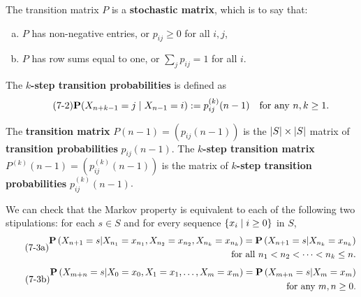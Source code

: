 \begin{theorem}
The transition matrix $P$ is a \textbf{stochastic matrix}, which is to say that: 
\begin{enumerate}[(a)]
    \item $P$ has non-negative entries, or $p_{ij} \geq 0$ for all $i, j$, 
    \item $P$ has row sums equal to one, or $\sum_j p_{ij} = 1$ for all $i$.
\end{enumerate}
\end{theorem}


\begin{definition}
The \textbf{$k$-step transition probabilities} is defined as
\begin{equation}
    \label{eq:7.2}
    \tag{7-2}
    \mathbf{P}(X_{n+k-1} = j \;\vert\; X_{n-1} = i) := p_{ij}^{(k)}(n-1) \quad \text{for any } n, k \geq 1.
\end{equation}
\end{definition}

\begin{definition}
The \textbf{transition matrix} $P(n-1) = (p_{ij}(n-1))$ is the $\left\vert S \right\vert \times \left\vert S \right\vert$ matrix of \textbf{transition probabilities} $p_{ij}(n-1)$. The \textbf{$k$-step transition matrix} $P^{(k)}(n-1) = (p_{ij}^{(k)}(n-1))$ is the matrix of \textbf{$k$-step transition probabilities} $p_{ij}^{(k)}(n-1)$.
\end{definition}

\begin{remark}
We can check that the Markov property is equivalent to each of the following two stipulations: for each $s \in S$ and for every sequence $\{ x_i \;\vert\; i \geq 0\}$ in $S$,
\begin{equation}
    \label{eq:7.3a}
    \tag{7-3a}
    \begin{split}
        \mathbf{P}\left(X_{n+1}=s | X_{n_{1}}=x_{n_{1}}, X_{n_{2}}=x_{n_{2}}, X_{n_{k}}=x_{n_{k}}\right)=\mathbf{P}\left(X_{n+1}=s | X_{n_{k}}=x_{n_{k}}\right) \\
        \text{for all } n_1 < n_2 < \cdots < n_k \leq n.
    \end{split}
\end{equation}
\begin{equation}
    \label{eq:7.3b}
    \tag{7-3b}
    \begin{split}
        \mathbf{P}\left(X_{m+n}=s | X_{0}=x_{0}, X_{1}=x_{1}, \ldots, X_{m}=x_{m}\right)=\mathbf{P}\left(X_{m+n}=s | X_{m}=x_{m}\right) \\ 
        \text{for any } m, n \geq 0.
    \end{split}
\end{equation}
\end{remark}

